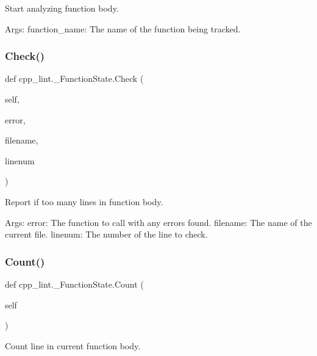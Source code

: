 \begin{DoxyVerb}Start analyzing function body.

Args:
  function_name: The name of the function being tracked.
\end{DoxyVerb}
 \mbox{\label{classcpp__lint_1_1___function_state_a74430cb0bb43e253f617bba640391d09}} 
\subsubsection{\texorpdfstring{Check()}{Check()}}
{\footnotesize\ttfamily def cpp\+\_\+lint.\+\_\+\+Function\+State.\+Check (\begin{DoxyParamCaption}\item[{}]{self,  }\item[{}]{error,  }\item[{}]{filename,  }\item[{}]{linenum }\end{DoxyParamCaption})}

\begin{DoxyVerb}Report if too many lines in function body.

Args:
  error: The function to call with any errors found.
  filename: The name of the current file.
  linenum: The number of the line to check.
\end{DoxyVerb}
 \mbox{\label{classcpp__lint_1_1___function_state_a402797f40424f11da27896926362b23f}} 
\subsubsection{\texorpdfstring{Count()}{Count()}}
{\footnotesize\ttfamily def cpp\+\_\+lint.\+\_\+\+Function\+State.\+Count (\begin{DoxyParamCaption}\item[{}]{self }\end{DoxyParamCaption})}

\begin{DoxyVerb}Count line in current function body.\end{DoxyVerb}
 \mbox{\label{classcpp__lint_1_1___function_state_a6d78fb5729c971706f781918291e4a0b}} 
